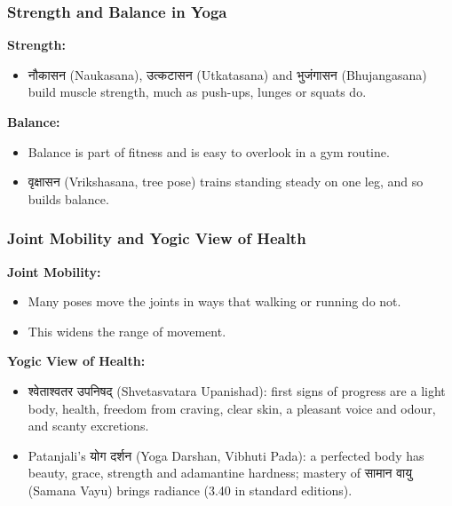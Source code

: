 \begin{frame}[fragile]\frametitle{Strength and Balance in Yoga}
    \textbf{Strength:}
    \begin{itemize}
        \item नौकासन (Naukasana), उत्कटासन (Utkatasana) and भुजंगासन (Bhujangasana) build muscle strength, much as push-ups, lunges or squats do.
    \end{itemize}


    \textbf{Balance:}
    \begin{itemize}
        \item Balance is part of fitness and is easy to overlook in a gym routine.
        \item वृक्षासन (Vrikshasana, tree pose) trains standing steady on one leg, and so builds balance.
    \end{itemize}
\end{frame}

\begin{frame}[fragile]\frametitle{Joint Mobility and Yogic View of Health}
    \textbf{Joint Mobility:}
    \begin{itemize}
        \item Many poses move the joints in ways that walking or running do not.
        \item This widens the range of movement.
    \end{itemize}


    \textbf{Yogic View of Health:}
    \begin{itemize}
        \item श्वेताश्वतर उपनिषद् (Shvetasvatara Upanishad): first signs of progress are a light body, health, freedom from craving, clear skin, a pleasant voice and odour, and scanty excretions.
        \item Patanjali's योग दर्शन (Yoga Darshan, Vibhuti Pada): a perfected body has beauty, grace, strength and adamantine hardness; mastery of सामान वायु (Samana Vayu) brings radiance (3.40 in standard editions).
    \end{itemize}
\end{frame}


